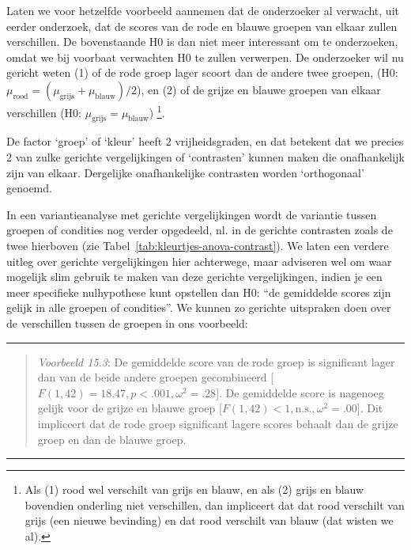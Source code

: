 \documentclass[
]{book}
\begin{document}
Laten we voor hetzelfde voorbeeld aannemen dat de onderzoeker al
verwacht, uit eerder onderzoek, dat de scores van de rode en blauwe
groepen van elkaar zullen verschillen. De bovenstaande H0 is dan niet
meer interessant om te onderzoeken, omdat we bij voorbaat verwachten H0
te zullen verwerpen. De onderzoeker wil nu gericht weten
(1) of de rode
groep lager scoort dan de andere twee groepen, (H0:
\(\mu_\textrm{rood} = (\mu_\textrm{grijs}+\mu_\textrm{blauw})/2\)), en
(2)
of de grijze en blauwe groepen van elkaar verschillen (H0:
\(\mu_\textrm{grijs} = \mu_\textrm{blauw}\))
\footnote{Als (1) rood wel verschilt van grijs en blauw, en als (2) grijs en blauw bovendien onderling niet verschillen, dan impliceert dat dat rood verschilt van grijs (een nieuwe bevinding) en dat rood verschilt van blauw (dat wisten we al).}.

De factor `groep' of `kleur' heeft 2 vrijheidsgraden, en dat betekent dat we
precies 2 van zulke gerichte vergelijkingen of `contrasten' kunnen maken
die onafhankelijk zijn van elkaar. Dergelijke onafhankelijke contrasten
worden `orthogonaal' genoemd.

In een variantieanalyse met gerichte vergelijkingen wordt de variantie
tussen groepen of condities nog verder opgedeeld, nl. in de gerichte
contrasten zoals de twee hierboven (zie
Tabel~\ref{tab:kleurtjes-anova-contrast}). We laten een verdere uitleg
over gerichte vergelijkingen hier achterwege, maar adviseren wel om waar
mogelijk slim gebruik te maken van deze gerichte vergelijkingen, indien
je een meer specifieke nulhypothese kunt opstellen dan H0: ``de
gemiddelde scores zijn gelijk in alle groepen of condities''. We kunnen
zo gerichte uitspraken doen over de verschillen tussen de groepen in ons
voorbeeld:

\begin{center}\rule{0.5\linewidth}{0.5pt}\end{center}

\begin{quote}
\emph{Voorbeeld 15.3}:
De gemiddelde score van de rode
groep is significant lager dan van de beide andere groepen gecombineerd
{[}\(F(1,42)=18.47, p<.001, \omega^2=.28\){]}. De gemiddelde score is
nagenoeg gelijk voor de grijze en blauwe groep
{[}\(F(1,42)<1, \textrm{n.s.}, \omega^2=.00\){]}.
Dit impliceert dat de
rode groep significant lagere scores behaalt dan de grijze groep en dan
de blauwe groep.
\end{quote}

\begin{center}\rule{0.5\linewidth}{0.5pt}\end{center}
\end{document}
